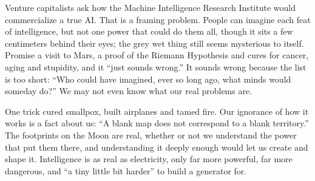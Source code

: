 Venture capitalists ask how the Machine Intelligence Research Institute would commercialize a true AI. That is a framing problem. People can imagine each feat of intelligence, but not one power that could do them all, though it sits a few centimeters behind their eyes; the grey wet thing still seems mysterious to itself. Promise a visit to Mars, a proof of the Riemann Hypothesis and cures for cancer, aging and stupidity, and it ``just sounds wrong.'' It sounds wrong because the list is too short: ``Who could have imagined, ever so long ago, what minds would someday do?'' We may not even know what our real problems are.

One trick cured smallpox, built airplanes and tamed fire. Our ignorance of how it works is a fact about us: ``A blank map does not correspond to a blank territory.'' The footprints on the Moon are real, whether or not we understand the power that put them there, and understanding it deeply enough would let us create and shape it. Intelligence is as real as electricity, only far more powerful, far more dangerous, and ``a tiny little bit harder'' to build a generator for.
